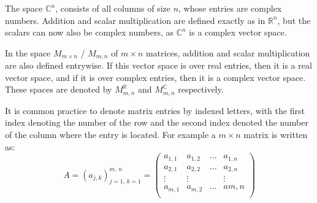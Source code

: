 \documentclass[12pt letter]{report}
\begin{document}
The space $\mathbb{C}^{n}$, consists of all columns of size $n$, whose entries are complex numbers. Addition and scalar
multiplication are defined exactly as in $\mathbb{R}^{n}$, but the scalars can now also be complex numbers, as
$\mathbb{C}^{n}$ is a complex vector space.


In the space $M_{m\times n}$ / $M_{m,n}$ of $m \times n$ matrices, addition and scalar multiplication are also defined
entrywise. If this vector space is over real entries, then it is a real vector space, and if it is over complex entries,
then it is a complex vector space. These spaces are denoted by $M^{\mathbb{R}}_{m,n}$ and $M^{\mathbb{C}}_{m,n}$
respectively.


It is common practice to denote matrix entries by indexed letters, with the first index denoting the number of the row
and the second index denoted the number of the column where the entry is located. For example a $m\times n$ matrix is
written as:
\[
  A = \left( a_{j,k} \right)^{m,\, n}_{j=1,\,  k=1} = \begin{pmatrix} a_{1,1}  & a_{1,2}  & \ldots & a_{1,n} \\
                a_{2, 1} & a_{2, 2} & \ldots & a_{2,n} \\
                \vdots   & \vdots   &        & \vdots  \\
                a_{m, 1} & a_{m, 2} & \ldots & a{m,n}  \\
  \end{pmatrix}
\]

\end{document}
